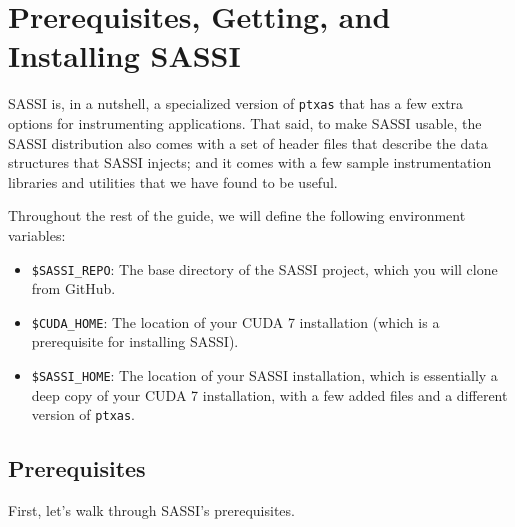 \section{Prerequisites, Getting, and Installing SASSI}

SASSI is, in a nutshell, a specialized version of \texttt{ptxas}
that has a few extra options for instrumenting applications.  That
said, to make SASSI usable, the SASSI distribution also comes with a
set of header files that describe the data structures that SASSI
injects; and it comes with a few sample instrumentation libraries and
utilities that we have found to be useful.

Throughout the rest of the guide, we will define the following
environment variables:
\begin{itemize}
\item \texttt{\$SASSI\_REPO}: The base directory of the SASSI project,
  which you will clone from GitHub.
\item \texttt{\$CUDA\_HOME}: The location of your CUDA 7 installation
  (which is a prerequisite for installing SASSI).
\item \texttt{\$SASSI\_HOME}: The location of your SASSI installation,
  which is essentially a deep copy of your CUDA 7 installation, with a
  few added files and a different version of \texttt{ptxas}.
\end{itemize}

\subsection{Prerequisites} 

First, let's walk through SASSI's prerequisites.

